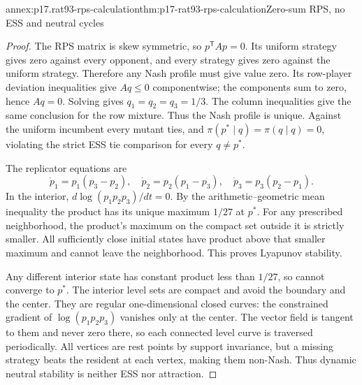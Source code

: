 \begin{annexitem}{annex:p17.rat93-rps-calculation}{thm:p17-rat93-rps-calculation}{Zero-sum RPS, no ESS and neutral cycles}
\begin{proof}
The RPS matrix is skew symmetric, so \(p^{\mathsf T}Ap=0\).
Its uniform strategy gives zero against every opponent, and every
strategy gives zero against the uniform strategy. Therefore any
Nash profile must give value zero. Its row-player deviation inequalities
give \(Aq\leq0\) componentwise; the components sum to zero, hence
\(Aq=0\). Solving gives \(q_1=q_2=q_3=1/3\). The column inequalities
give the same conclusion for the row mixture. Thus the Nash profile
is unique. Against the uniform incumbent every mutant ties, and
\(\pi(p^*\mid q)=\pi(q\mid q)=0\), violating the strict ESS
tie comparison for every \(q\ne p^*\).

The replicator equations are
\[
 \dot p_1=p_1(p_3-p_2),\quad
 \dot p_2=p_2(p_1-p_3),\quad
 \dot p_3=p_3(p_2-p_1).
\]
In the interior,
\(d\log(p_1p_2p_3)/dt=0\). By the arithmetic--geometric mean
inequality the product has its unique maximum \(1/27\) at \(p^*\).
For any prescribed neighborhood, the product's maximum on the compact
set outside it is strictly smaller. All sufficiently close initial
states have product above that smaller maximum and cannot leave the
neighborhood. This proves Lyapunov stability.

Any different interior state has constant product less than \(1/27\),
so cannot converge to \(p^*\). The interior level sets are compact
and avoid the boundary and the center. They are regular one-dimensional
closed curves: the constrained gradient of \(\log(p_1p_2p_3)\)
vanishes only at the center. The vector field is tangent to them and
never zero there, so each connected level curve is traversed periodically.
All vertices are rest points by support invariance, but a missing
strategy beats the resident at each vertex, making them non-Nash.
Thus dynamic neutral stability is neither ESS nor attraction.
\end{proof}
\end{annexitem}

